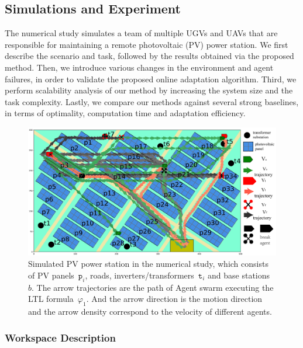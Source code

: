 \subsection{Simulations and Experiment}\label{subsec:simulation}


The numerical study simulates a team of multiple UGVs and UAVs
that are responsible for maintaining a remote photovoltaic (PV) power station.
We first describe the scenario and task,
followed by the results obtained via the proposed method.
Then, we introduce various changes in the environment and agent failures,
in order to validate the proposed online adaptation algorithm.
Third, we perform scalability analysis of our method by increasing
the system size and the task complexity.
Lastly, we compare our methods against several strong baselines, in terms of
optimality, computation time and adaptation efficiency.


\begin{figure}
\includegraphics[scale=0.18]{figures/background3.pdf}
\caption{Simulated PV power station in the numerical study,
  which consists of PV panels~$\texttt{p}_i$, roads,
  inverters/transformers~$\texttt{t}_i$ and base stations~$b$.
  The arrow trajectories are the path of Agent swarm
  executing the LTL formula~$\varphi_{1}$. And the arrow direction
  is the motion direction and the arrow density correspond to the velocity of different agents.}
\label{fig:workspace}
\end{figure}

\subsubsection{Workspace Description}\label{subsubsec:ws}


